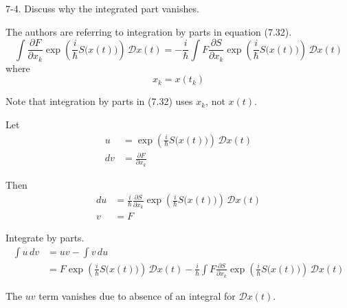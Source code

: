 \documentclass[12pt]{article}
\begin{document}
7-4.
Discuss why the integrated part vanishes.

\bigskip
The authors are referring to integration by parts in equation (7.32).
\begin{equation*}
\int\frac{\partial F}{\partial x_k}
\exp\left(\frac{i}{\hbar}S\big(x(t)\big)\right)\,\mathcal Dx(t)
=
-\frac{i}{\hbar}\int F\frac{\partial S}{\partial x_k}
\exp\left(\frac{i}{\hbar}S\big(x(t)\big)\right)\,\mathcal Dx(t)
\tag{7.32}
\end{equation*}
where
\begin{equation*}
x_k=x(t_k)
\end{equation*}

Note that integration by parts in (7.32) uses $x_k$, not $x(t)$.

\bigskip
Let
\begin{align*}
u&=\exp\left(\frac{i}{\hbar}S\big(x(t)\big)\right)\,\mathcal Dx(t)
\\
dv&=\frac{\partial F}{\partial x_k}
\end{align*}

Then
\begin{align*}
du&=\frac{i}{\hbar}
\frac{\partial S}{\partial x_k}
\exp\left(\frac{i}{\hbar}S\big(x(t)\big)\right)
\,\mathcal Dx(t)
\\
v&=F
\end{align*}

Integrate by parts.
\begin{align*}
\int u\,dv&=uv-\int v\,du
\\
&=F\exp\left(\frac{i}{\hbar}S\big(x(t)\big)\right)\,\mathcal Dx(t)
-\frac{i}{\hbar}\int F
\frac{\partial S}{\partial x_k}
\exp\left(\frac{i}{\hbar}S\big(x(t)\big)\right)
\,\mathcal Dx(t)
\end{align*}

The $uv$ term vanishes due to absence of an integral for $\mathcal Dx(t)$.
\end{document}
